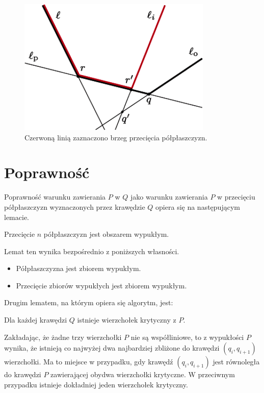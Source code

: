 \begin{figure}
  \centering
  \includegraphics[scale=0.6]{img/containment2}
  \caption{\label{img:containment2} Czerwoną linią zaznaczono brzeg
    przecięcia półpłaszczyzn.}
\end{figure}


\section{Poprawność}
Poprawność warunku zawierania $P$ w $Q$ jako warunku zawierania $P$ w
przecięciu półpłaszczyzn wyznaczonych przez krawędzie $Q$ opiera się
na następującym lemacie.

\begin{lemat}\emph{\cite{Chazelle83}}
  Przecięcie $n$ półpłaszczyzn jest obszarem wypukłym.
\end{lemat}

Lemat ten wynika bezpośrednio z poniższych własności.

\begin{itemize}
  \item Półpłaszczyzna jest zbiorem wypukłym.
  \item Przecięcie zbiorów wypukłych jest zbiorem wypukłym.
\end{itemize}

Drugim lematem, na którym opiera się algorytm, jest:

\begin{lemat}\emph{\cite{Chazelle83}}
  Dla każdej krawędzi $Q$ istnieje wierzchołek krytyczny z $P$.
\end{lemat}

Zakładając, że żadne trzy wierzchołki $P$ nie są współliniowe, to z
wypukłości $P$ wynika, że istnieją co najwyżej dwa najbardziej
zbliżone do krawędzi $(q_i,q_{i+1})$ wierzchołki. Ma to miejsce w
przypadku, gdy krawędź $(q_i,q_{i+1})$ jest równoległa do krawędzi $P$
zawierającej obydwa wierzchołki krytyczne. W przeciwnym przypadku
istnieje dokładniej jeden wierzchołek krytyczny.

